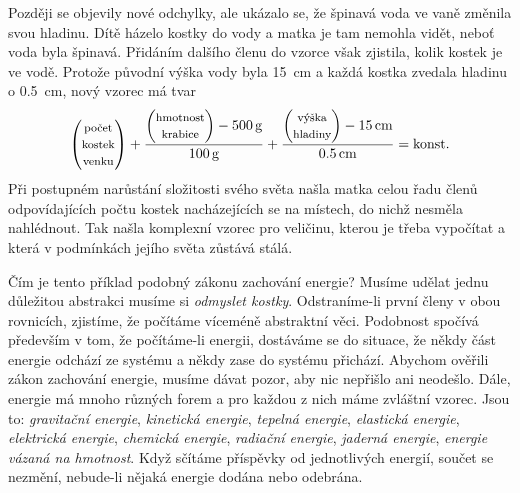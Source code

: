     Později se objevily nové odchylky, ale ukázalo se, že špinavá voda ve vaně změnila svou 
    hladinu. Dítě házelo kostky do vody a matka je tam nemohla vidět, neboť voda byla špinavá. 
    Přidáním dalšího členu do vzorce však zjistila, kolik kostek je ve vodě. Protože původní výška 
    vody byla \SI{15}{\cm} a každá kostka zvedala hladinu o \SI{0.5}{\cm}, nový vzorec má tvar
    \begin{equation*}
        \begin{pmatrix} 
          \text{\footnotesize{počet}}   \\
          \text{\footnotesize{kostek}}  \\
          \text{\footnotesize{venku}}
        \end{pmatrix}
       +
      \frac{
            \begin{pmatrix}
              \text{\footnotesize{hmotnost}}  \\
              \text{\footnotesize{krabice}}
            \end{pmatrix}
        - \SI{500}{\gram}}{ \SI{100}{\gram}} +
      \frac{
            \begin{pmatrix}
              \text{\footnotesize{výška}}  \\
              \text{\footnotesize{hladiny}}
            \end{pmatrix}
        - \SI{15}{\cm}}{ \SI{0.5}{\cm}} = 
      \text{konst.}
    \end{equation*}
    Při postupném narůstání složitosti svého světa našla matka celou řadu členů odpovídajících 
    počtu kostek nacházejících se na místech, do nichž nesměla nahlédnout. Tak našla komplexní 
    vzorec pro veličinu, kterou je třeba vypočítat a která v podmínkách jejího světa zůstává stálá.
    
    Čím je tento příklad podobný zákonu zachování energie? Musíme udělat jednu důležitou abstrakci 
    musíme si \emph{odmyslet kostky}. Odstraníme-li první členy v obou rovnicích, zjistíme, že 
    počítáme víceméně abstraktní věci. Podobnost spočívá především v tom, že počítáme-li energii, 
    dostáváme se do situace, že někdy část energie odchází ze systému a někdy zase do systému 
    přichází. Abychom ověřili zákon zachování energie, musíme dávat pozor, aby nic nepřišlo ani 
    neodešlo. Dále, energie má mnoho různých forem a pro každou z nich máme zvláštní vzorec. Jsou 
    to: \emph{gravitační energie}, \emph{kinetická energie}, \emph{tepelná energie}, 
    \emph{elastická energie}, \emph{elektrická energie}, \emph{chemická energie}, \emph{radiační 
    energie}, \emph{jaderná energie}, \emph{energie vázaná na hmotnost}. Když sčítáme příspěvky od 
    jednotlivých energií, součet se nezmění, nebude-li nějaká energie dodána nebo odebrána.
    
